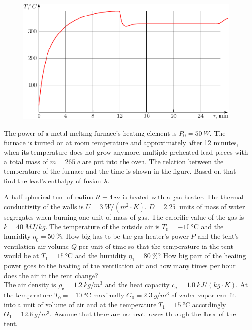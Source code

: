 \documentclass[11pt]{article}
\begin{document}
\probeng
\begin{figure}%
\includegraphics[width=\linewidth]{2012-v3g-07-ahi_graafik}%
\end{figure}
The power of a metal melting furnace’s heating element is $P_0 = \SI{50}{W}$. The furnace is turned on at room temperature and approximately after 12 minutes, when its temperature does not grow anymore, multiple preheated lead pieces with a total mass of $m = \SI{265}{g}$ are put into the oven. The relation between the temperature of the furnace and the time is shown in the figure. Based on that find the lead’s enthalpy of fusion $\lambda$.
\probend
\bigskip


\probeng
A half-spherical tent of radius $R=\SI{4}{m}$ is heated with a gas heater. The thermal conductivity of the walls is $U=\SI{3}{W/(m^{2}\cdot K)}$. $D=\SI{2.25}{}$ units of mass of water segregates when burning one unit of mass of gas. The calorific value of the gas is $k=\SI{40}{MJ/kg}$. The temperature of the outside air is $T_{0}=\SI{-10}{\degreeCelsius}$ and the humidity $\eta_{0}=\SI{50}{\percent}$. How big has to be the gas heater’s power $P$ and the tent’s ventilation air volume $Q$ per unit of time so that the temperature in the tent would be at $T_{1}=\SI{15}{\degreeCelsius}$ and the humidity $\eta_{1}=\SI{80}{\percent}$? How big part of the heating power goes to the heating of the ventilation air and how many times per hour does the air in the tent change?\\
The air density is $\rho_{a}=\SI{1.2}{kg/m^{3}}$ and the heat capacity $c_{a}=\SI{1.0}{kJ/(kg\cdot K)}$. At the temperature $T_{0}=\SI{-10}{\degreeCelsius}$ maximally $G_{0}=\SI{2.3}{g/m^{3}}$ of water vapor can fit into a unit of volume of air and at the temperature $T_{1}=\SI{15}{\degreeCelsius}$ accordingly $G_{1}=\SI{12.8}{g/m^{3}}$. Assume that there are no heat losses through the floor of the tent.
\probend
\bigskip
\end{document}
